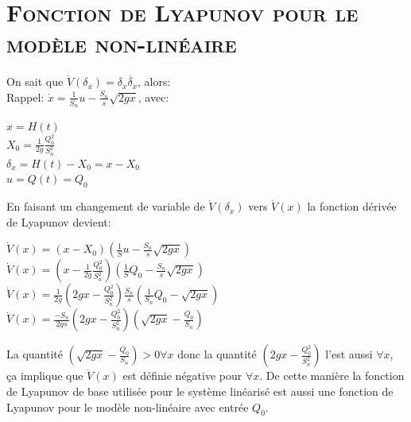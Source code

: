 \break
\section{\textsc{Fonction de Lyapunov pour le modèle non-linéaire}}
		
		\par On sait que  $\dot{V}(\delta_x) = \delta_x \dot{\delta_x} $, alors:\\

		Rappel: $ \dot{x}=\frac{1}{S_n} u - \frac{S_n}{s} \sqrt{2 g x}$, avec:
		\begin{center}
		 $ x = H(t)$ \\[0.25 cm]
		 $ X_0 = \frac{1}{2g} \frac{Q^2_0}{S^2_n}$ \\[0.25 cm]
		 $ \delta_x = H(t)-X_0 = x-X_0 $ \\[0.25 cm]
		 $ u = Q(t) = Q_0 $
		\end{center}
		
		En faisant un changement de variable de $ \dot{V}(\delta_x) $ vers $ \dot{V}(x) $ la fonction dérivée de Lyapunov devient:
		\begin{center}
			
		 $\dot{V}(x) = (x - X_0 ) ( \frac{1}{S} u - \frac{S_n}{s} \sqrt{2 g x}) $\\[0.25 cm]		
		
		 $\dot{V}(x) = (x - \frac{1}{2g} \frac{Q^2_0}{S^2_n} ) ( \frac{1}{S} Q_0 - \frac{S_n}{s} \sqrt{2 g x}) $\\[0.25 cm]
		 $ \dot{V}(x) = \frac{1}{2g} (2g x - \frac{Q^2_0}{S^2_n} ) \frac{S_n}{s}( \frac{1}{S_n} Q_0 - \sqrt{2 g x})$ \\[0.25 cm]
		 $ \dot{V}(x) =\frac{-S_n}{2gs}(2g x - \frac{Q^2_0}{S^2_n} ) ( \sqrt{2gx} - \frac{Q_0}{S_n} ) $
		 \end{center}
		 
	\par La quantité $ ( \sqrt{2gx} - \frac{Q_0}{S_n} ) > 0 \forall x  $ donc la quantité $ (2g x - \frac{Q^2_0}{S^2_n} ) $ l'est aussi $\forall x$, ça implique que $ \dot{V}(x) $ est définie négative pour $\forall x$. De cette manière la fonction de Lyapunov de base utilisée pour le système linéarisé est aussi une fonction de Lyapunov pour le modèle non-linéaire avec entrée $Q_0$.
	  		 